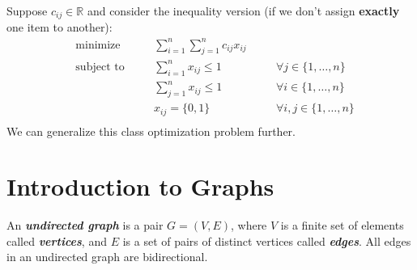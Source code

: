 Suppose $c_{ij}\in\mathbb{R}$ and consider the inequality version
(if we don't assign \textbf{exactly} one item to another):
\begin{equation}
    \begin{aligned}
         & \text{minimize}   & \quad & \sum\limits_{i = 1}^{n}\sum\limits_{j = 1}^{n}c_{ij}x_{ij}                                       \\
         & \text{subject to} &       & \sum\limits_{i = 1}^{n}x_{ij}\leqslant 1                   & \quad & \forall j\in\{1,\dots,n\}   \\
         &                   &       & \sum\limits_{j = 1}^{n}x_{ij}\leqslant 1                   & \quad & \forall i\in\{1,\dots,n\}   \\
         &                   &       & x_{ij}=\{0,1\}                                             & \quad & \forall i,j\in\{1,\dots,n\} \\
         &                   &       &
    \end{aligned}\tag{IP}
\end{equation}
We can generalize this class optimization problem further.

\chapter{Introduction to Graphs}

\begin{defbox}
    \begin{definition}
        An \textbf{\emph{undirected graph}} is a pair $G=(V,E)$, where $V$ is a finite set
        of elements called \textbf{\emph{vertices}}, and $E$ is a set of pairs of distinct
        vertices called \textbf{\emph{edges}}. All edges in an undirected graph are bidirectional.
    \end{definition}
\end{defbox}

